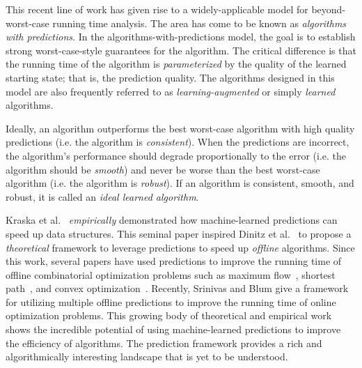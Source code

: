 \documentclass[11pt]{article}
\newcommand{\defn}{\emph}
\begin{document}
This recent line of work has given rise to a widely-applicable model for beyond-worst-case running time analysis.   The area has come to be known as \defn{algorithms with predictions}. In the algorithms-with-predictions model, the goal is to establish strong worst-case-style guarantees for the algorithm.  The critical difference is that the running time of the algorithm is \emph{parameterized} by the quality of the learned starting state; that is, the prediction quality. The algorithms designed in this model are also frequently referred to as \emph{learning-augmented} or simply \emph{learned} algorithms.

Ideally, an algorithm outperforms the best worst-case algorithm with high quality predictions (i.e. the algorithm is \defn{consistent}). When the predictions are incorrect,  the algorithm's performance should degrade proportionally to the error (i.e. the algorithm should be \defn{smooth}) and never be worse than the best worst-case algorithm (i.e. the algorithm is \defn{robust}). If an algorithm is consistent, smooth, and robust, it is called an \defn{ideal learned algorithm}. 

Kraska et al.~\cite{KraskaBCDP18}  \emph{empirically} demonstrated how machine-learned predictions can speed up data structures.  
This seminal paper inspired Dinitz et al.~\cite{DinitzILMV21} to propose a \emph{theoretical} framework to leverage predictions to speed up \emph{offline} algorithms.
Since this work, several papers have used predictions to improve the running time of offline combinatorial optimization problems such as maximum flow~\cite{DaviesMVW,POLAK2024106487}, shortest path~\cite{LattanziSV23}, and convex optimization~\cite{SakaueO22}. Recently, Srinivas and Blum \cite{SrinivasB25} give a framework for utilizing multiple offline predictions to improve the running time of online optimization problems.
This growing body of theoretical and empirical work shows the incredible potential of using machine-learned predictions to improve the efficiency of algorithms. The prediction framework provides a rich and algorithmically interesting landscape that is yet to be understood. 
\end{document}
